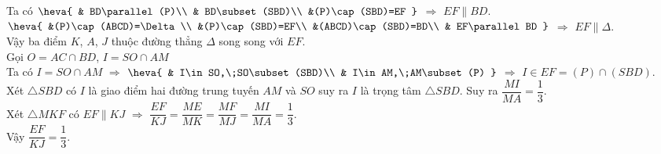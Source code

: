 \begin{ex}
{		 Ta có $\heva{
		& BD\parallel  (P)\\
		& BD\subset(SBD)\\ 
		 &(P)\cap(SBD)=EF
		}$  $\Rightarrow$ $EF\parallel BD$.\\
		$\heva{ 
		 &(P)\cap(ABCD)=\Delta\\
		&(P)\cap(SBD)=EF\\ 
		&(ABCD)\cap(SBD)=BD\\ 
		& EF\parallel BD 
		}$ $\Rightarrow$ $EF\parallel  \Delta$.\\
		Vậy ba điểm $K$, $A$, $J$ thuộc đường thẳng $\Delta$  song song với $EF$.\\
		Gọi $O=AC\cap  BD$, $I=SO\cap AM$\\
		Ta có  $I=SO\cap AM$ $\Rightarrow$ $\heva{
		& I\in SO,\;SO\subset(SBD)\\ 
		 & I\in AM,\;AM\subset(P)
		}$  $\Rightarrow$ $I\in EF=(P)\cap(SBD)$.\\
		Xét $\triangle SBD$ có $I$ là giao điểm  hai đường trung tuyến $AM$ và $SO$ suy ra $I$ là trọng tâm $\triangle SBD$. Suy ra $\dfrac{MI}{MA}=\dfrac{1}{3}$.\\
		Xét $\triangle MKF$  có $EF\parallel KJ$ $\Rightarrow$ $\dfrac{EF}{KJ}=\dfrac{ME}{MK}=\dfrac{MF}{MJ}=\dfrac{MI}{MA}=\dfrac{1}{3}$.\\
		Vậy $\dfrac{EF}{KJ}=\dfrac{1}{3}$. 
	 }
\end{ex}

